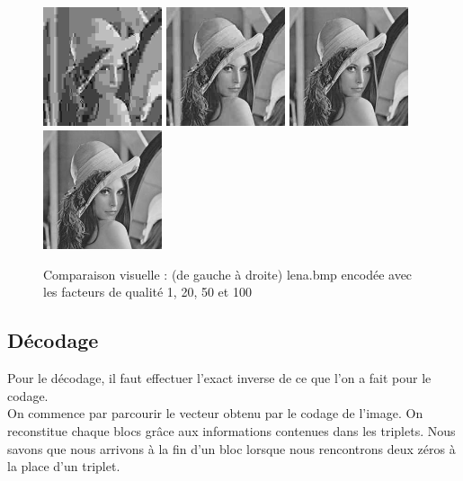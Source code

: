 \documentclass[a4paper, 12pt]{article}
\begin{document}
\begin{figure}[H]
	\centering
		\includegraphics[width=3.5cm, height=3.5cm]{../lena_1.jpg}
		\includegraphics[width=3.5cm, height=3.5cm]{../lena_20.jpg}
		\includegraphics[width=3.5cm, height=3.5cm]{../lena_50.jpg}
		\includegraphics[width=3.5cm, height=3.5cm]{../lena_100.jpg}
	\caption{Comparaison visuelle : (de gauche à droite) lena.bmp encodée avec les facteurs de qualité 1, 20, 50 et 100}
	\label{fig:comparaison_img_quant}
\end{figure}

\subsection{Décodage}

Pour le décodage, il faut effectuer l'exact inverse de ce que l'on a fait pour le codage. \\
On commence par parcourir le vecteur obtenu par le codage de l'image. On reconstitue chaque blocs grâce aux informations contenues dans les triplets. Nous savons que nous arrivons à la fin d'un bloc lorsque nous rencontrons deux zéros à la place d'un triplet. \\
\end{document}
